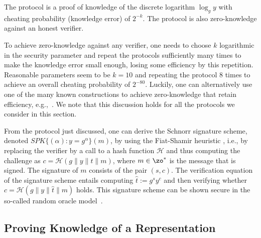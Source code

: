 The protocol is a proof of knowledge of the discrete logarithm $\log_g y$ 
with cheating probability (knowledge error) of $2^{-k}$.
The protocol is also zero-knowledge against an honest verifier.

To achieve zero-knowledge against any verifier, one  needs to choose
$k$ logarithmic in the security parameter and repeat the protocols sufficiently 
many times to make the knowledge error small enough, losing some efficiency
by this repetition.
Reasonable parameters seem to be $k=10$ and repeating the protocol $8$ times to achieve an
overall cheating probability of $2^{-80}$.
Luckily, one can alternatively use one of the many known constructions to achieve zero-knowledge
that retain efficiency, e.g.,~\cite{damgar00}.
We note that this discussion holds for all the protocols we consider in this section.


From the protocol just discussed, one can derive the Schnorr signature scheme,
denoted  $\textit{SPK}\{(\alpha): y = g^\alpha \}(m)$, by
using the Fiat-Shamir heuristic \cite{fiasha86,poiste96a}, i.e., by
replacing the verifier by a call to a hash function $\mathcal{H}$ and 
thus computing the challenge as $c = \mathcal{H}(g\|y\|t\|m)$,
where $m \in \zo^*$ is the message that is signed.
The signature of $m$ consists of the pair $(s,c)$.
The verification equation of the signature scheme entails
computing $\hat{t} := g^s y^{c}$ and then verifying 
whether $c = \mathcal{H}(g\|y\|\hat{t}\|m)$ holds.
This signature scheme can be shown secure in the so-called random oracle 
model~\cite{belrog93}. 



\subsection{Proving Knowledge of a Representation}
\label{Proving Knowledge of a Representation}

